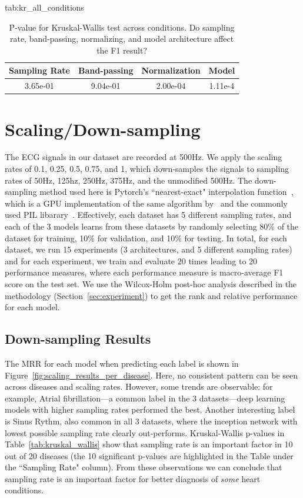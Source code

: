 \documentclass[pmlr,twocolumn]{jmlr}%
\begin{document}
\begin{table}[!h]
\floatconts
  {tab:kr_all_conditions}
  {\caption{P-value for Kruskal-Wallis test across conditions. Do sampling rate, band-passing, normalizing, and model architecture affect the F1 result?}}
  {\begin{tabular}{|c|c|c|c|}
  \hline
    \bfseries Sampling Rate & \bfseries Band-passing & \bfseries Normalization & \bfseries Model \\
  \hline
  3.65e-01 & 9.04e-01 & 2.00e-04 & 1.11e-4  \\
  \hline
  \end{tabular}}
\end{table}



\section{Scaling/Down-sampling}
\label{sec:scaling}
The ECG signals in our dataset are recorded at 500Hz. We apply the  scaling rates of 0.1, 0.25, 0.5, 0.75, and 1, which down-samples the signals to sampling rates of 50Hz, 125hz, 250Hz, 375Hz, and the unmodified 500Hz. The down-sampling method used here is Pytorch's ``nearest-exact" interpolation function~\citep{NEURIPS2019_9015}, which is a GPU implementation of the same algorithm by~\citet{van2014scikit} and the commonly used PIL libarary~\citep{clark2015pillow}. Effectively, each dataset has 5 different sampling rates, and each of the 3 models learns from these datasets by randomly selecting 80\% of the dataset for training, 10\% for validation, and 10\% for testing. In total, for each dataset, we run 15 experiments (3 architectures, and 5 different sampling rates) and for each experiment, we train and evaluate 20 times leading to 20 performance measures, where each performance measure is macro-average F1 score on the test set. We use the Wilcox-Holm post-hoc analysis described in the methodology (Section~\ref{sec:experiment}) to get the rank and relative performance for each model. 
\subsection{Down-sampling Results}
\label{sec_ds_results}
The MRR for each model when predicting each label is shown in Figure~\ref{fig:scaling_results_per_disease}. Here, no consistent pattern can be seen across diseases and scaling rates. However, some trends are observable: for example, Atrial fibrillation---a common label in the 3 datasets---deep learning models with higher sampling rates performed the best. Another interesting label is Sinus Rythm, also common in all 3 datasets,  where the inception network with lowest possible sampling rate clearly out-performs. Kruskal-Wallis p-values in Table~\ref{tab:kruskal_wallis} show that sampling rate is an important factor in 10 out of 20 diseases (the 10 significant p-values are highlighted in the Table under the ``Sampling Rate" column). From these observations we can conclude that sampling rate is an important factor for better diagnosis of \textit{some} heart conditions. 
\end{document}
